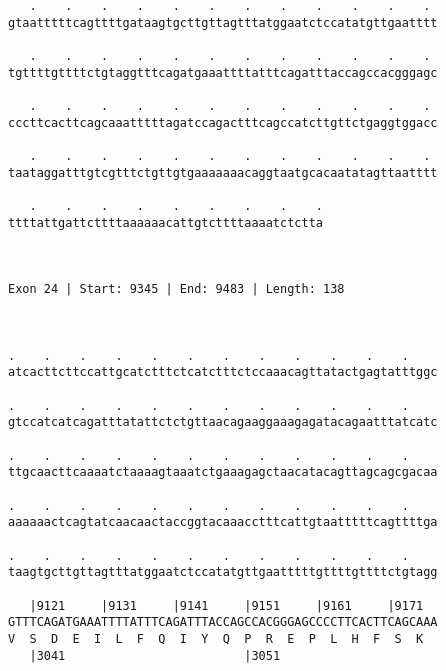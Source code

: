 \documentclass{article}
\begin{document}
\begin{Verbatim}
   .    .    .    .    .    .    .    .    .    .    .    . 
gtaatttttcagttttgataagtgcttgttagtttatggaatctccatatgttgaatttt
                                                            
   .    .    .    .    .    .    .    .    .    .    .    . 
tgttttgttttctgtaggtttcagatgaaattttatttcagatttaccagccacgggagc
                                                            
   .    .    .    .    .    .    .    .    .    .    .    . 
cccttcacttcagcaaatttttagatccagactttcagccatcttgttctgaggtggacc
                                                            
   .    .    .    .    .    .    .    .    .    .    .    . 
taataggatttgtcgtttctgttgtgaaaaaaacaggtaatgcacaatatagttaatttt
                                                            
   .    .    .    .    .    .    .    .    .
ttttattgattcttttaaaaaacattgtcttttaaaatctctta
                                            
                                            
 
Exon 24 | Start: 9345 | End: 9483 | Length: 138



.    .    .    .    .    .    .    .    .    .    .    .    
atcacttcttccattgcatctttctcatctttctccaaacagttatactgagtatttggc
                                                            
.    .    .    .    .    .    .    .    .    .    .    .    
gtccatcatcagatttatattctctgttaacagaaggaaagagatacagaatttatcatc
                                                            
.    .    .    .    .    .    .    .    .    .    .    .    
ttgcaacttcaaaatctaaaagtaaatctgaaagagctaacatacagttagcagcgacaa
                                                            
.    .    .    .    .    .    .    .    .    .    .    .    
aaaaaactcagtatcaacaactaccggtacaaacctttcattgtaatttttcagttttga
                                                            
.    .    .    .    .    .    .    .    .    .    .    .    
taagtgcttgttagtttatggaatctccatatgttgaatttttgttttgttttctgtagg
                                                            
   |9121     |9131     |9141     |9151     |9161     |9171  
GTTTCAGATGAAATTTTATTTCAGATTTACCAGCCACGGGAGCCCCTTCACTTCAGCAAA
V  S  D  E  I  L  F  Q  I  Y  Q  P  R  E  P  L  H  F  S  K  
   |3041                         |3051                      
  

\end{Verbatim}
\end{document}
